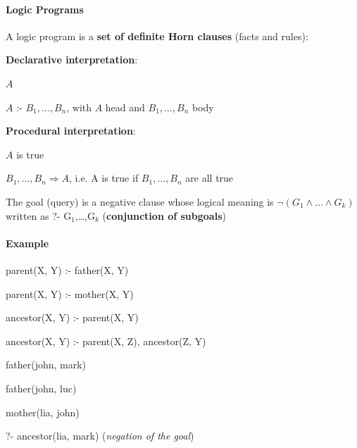 \documentclass[10pt]{report}
\begin{document}
\paragraph{Logic Programs} A logic program is a \textbf{set of definite Horn clauses} (facts and rules):
\begin{list}{}{}
	\item \textbf{Declarative interpretation}: \begin{list}{}{}
		\item $A$
		\item $A$ :- $B_1,\ldots,B_n$, with $A$ head and $B_1,\ldots,B_n$ body
	\end{list}
	\item \textbf{Procedural interpretation}: \begin{list}{}{}
		\item $A$ is true
		\item $B_1,\ldots,B_n\Rightarrow A$, i.e. A is true if $B_1,\ldots,B_n$ are all true
		\item The goal (query) is a negative clause whose logical meaning is $\neg(G_1\wedge\ldots\wedge G_k)$ written as ?- G$_1$,\ldots,G$_k$ (\textbf{conjunction of subgoals})
	\end{list}
\end{list}
\paragraph{Example} \begin{list}{}{}
	\item parent(X, Y) :- father(X, Y)
	\item parent(X, Y) :- mother(X, Y)
	\item ancestor(X, Y) :- parent(X, Y)
	\item ancestor(X, Y) :- parent(X, Z), ancestor(Z, Y)
	\item father(john, mark)
	\item father(john, luc)
	\item mother(lia, john)
	\item[?-] ancestor(lia, mark) (\textit{negation of the goal})
\end{list}
\end{document}
